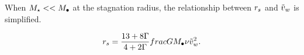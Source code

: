 
When $M_{\star} << M_{\bullet}$ at the stagnation radius, the relationship
between $r_s$ and $\tilde{v}_{w}$ is simplified.

\begin{align}
r_s=\frac{13+8\Gamma}{4+2\Gamma} frac{G M_{\bullet}}{\nu \tilde{v}_{w}^2}.
\end{align}


